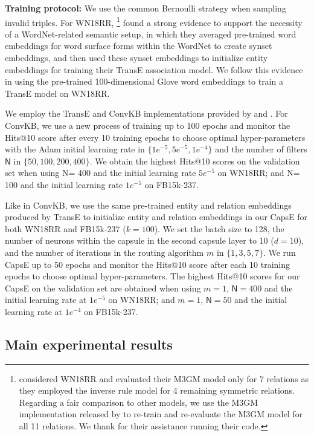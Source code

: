 \documentclass[11pt,a4paper]{article}
\begin{document}
\noindent\textbf{Training protocol:}
We use the common Bernoulli strategy \citep{AAAI148531,AAAI159571} when sampling invalid triples. 
For WN18RR, \citet{yuvalpinterm3gm}\footnote{
\citet{yuvalpinterm3gm} considered WN18RR and evaluated their M3GM model only for 7 relations as they employed the inverse rule model \citep{Dettmers2017} for 4 remaining symmetric relations. 
Regarding a fair comparison to other models, we use the M3GM implementation released by \citet{yuvalpinterm3gm} to re-train and re-evaluate the M3GM model for all 11 relations. 
We thank \citet{yuvalpinterm3gm} for their assistance running their code.
} 
found a strong evidence to support the necessity of a WordNet-related semantic setup, in which they averaged pre-trained word embeddings for word surface forms within the WordNet to create synset embeddings, and then used these synset embeddings to initialize entity embeddings for training their TransE association model.
We follow this evidence in using the pre-trained 100-dimensional Glove word embeddings \citep{pennington2014glove} to train a TransE model on WN18RR.

We employ the TransE and ConvKB implementations provided by \citet{NguyenNAACL2016} and \citet{Nguyen2018}. 
For ConvKB, we use a new process of training up to 100 epochs and monitor the Hits@10 score after every 10 training epochs to choose optimal hyper-parameters with the Adam initial learning rate in $ \{1e^{-5}, 5e^{-5}, 1e^{-4}\}$ and the number of filters $\mathsf{N}$ in $\{50, 100, 200, 400\}$.
We obtain the highest Hits@10 scores on the validation set when using N= 400 and the initial learning rate $5e^{-5}$ on WN18RR; and N= 100 and the initial learning rate $1e^{-5}$ on FB15k-237.

Like in ConvKB, we use the same pre-trained entity and relation embeddings produced by TransE to initialize entity and relation embeddings in our CapsE for both WN18RR and FB15k-237 ($k = 100$).
We set the batch size to 128, the number of neurons within the capsule in the second capsule layer to 10 ($d = 10$), and the number of iterations in the routing algorithm $m$ in $\{1, 3, 5, 7\}$.
We run CapsE up to 50 epochs and monitor the Hits@10 score after each 10 training epochs to choose optimal hyper-parameters.
The highest Hits@10 scores for our CapsE on the validation set are obtained when using $m = 1$, $\mathsf{N} = 400$
and the initial learning rate at $1e^{-5}$ on WN18RR; 
and $m = 1$, $\mathsf{N} = 50$
and the initial learning rate at $1e^{-4}$ on FB15k-237.

\subsection{Main experimental results}
\end{document}
